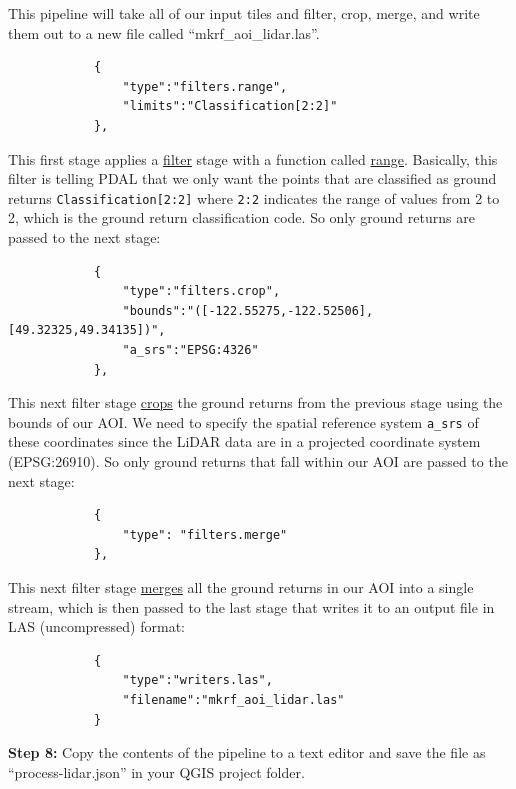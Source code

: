\documentclass[
]{book}
\begin{document}
This pipeline will take all of our input tiles and filter, crop, merge, and write them out to a new file called ``mkrf\_aoi\_lidar.las''.

\begin{verbatim}
            {
                "type":"filters.range",
                "limits":"Classification[2:2]"
            },
\end{verbatim}

This first stage applies a \href{https://pdal.io/en/2.6.0/stages/filters.html}{filter} stage with a function called \href{https://pdal.io/en/2.6.0/stages/filters.range.html\#filters-range}{range}. Basically, this filter is telling PDAL that we only want the points that are classified as ground returns \texttt{Classification{[}2:2{]}} where \texttt{2:2} indicates the range of values from 2 to 2, which is the ground return classification code. So only ground returns are passed to the next stage:

\begin{verbatim}
            {
                "type":"filters.crop",
                "bounds":"([-122.55275,-122.52506],[49.32325,49.34135])",
                "a_srs":"EPSG:4326"
            },
\end{verbatim}

This next filter stage \href{https://pdal.io/en/2.6.0/stages/filters.crop.html\#filters-crop}{crops} the ground returns from the previous stage using the bounds of our AOI. We need to specify the spatial reference system \texttt{a\_srs} of these coordinates since the LiDAR data are in a projected coordinate system (EPSG:26910). So only ground returns that fall within our AOI are passed to the next stage:

\begin{verbatim}
            {
                "type": "filters.merge"
            },
\end{verbatim}

This next filter stage \href{https://pdal.io/en/2.6.0/stages/filters.merge.html\#filters-merge}{merges} all the ground returns in our AOI into a single stream, which is then passed to the last stage that writes it to an output file in LAS (uncompressed) format:

\begin{verbatim}
            {
                "type":"writers.las",
                "filename":"mkrf_aoi_lidar.las"
            }
\end{verbatim}

\textbf{Step 8:} Copy the contents of the pipeline to a text editor and save the file as ``process-lidar.json'' in your QGIS project folder.
\end{document}
